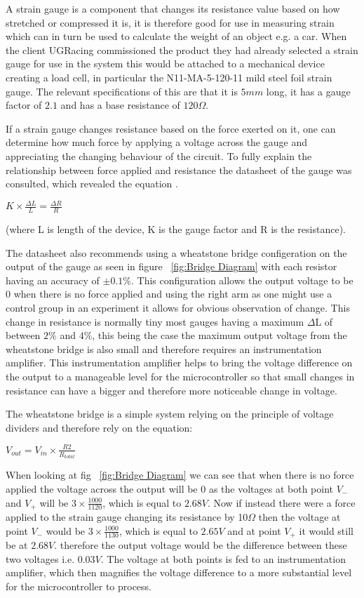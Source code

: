 A strain gauge is a component that changes its resistance value based on how stretched or compressed it is, it is therefore good for use in measuring strain which can in turn be used to calculate the weight of an object e.g. a car. When the client UGRacing commissioned the product they had already selected a strain gauge for use in the system this would be attached to a mechanical device creating a load cell, in particular the N11-MA-5-120-11 mild steel foil strain gauge. The relevant specifications of this are that it is $5mm$ long, it has a gauge factor of $2.1$ and has a base resistance of $120\Omega$.

If a strain gauge changes resistance based on the force exerted on it, one can determine how much force by applying a voltage across the gauge and appreciating the changing behaviour of the circuit. To fully explain the relationship between force applied and resistance the datasheet of the gauge was consulted, which revealed the equation \cite{strain_data_sheet}.


\centerline{$K \times \frac{\Delta L}{L} = \frac{\Delta R}{R}$}\label{eq:strain}

 (where L is length of the device, K is the gauge factor and R is the resistance).  

The datasheet also recommends using a wheatstone bridge configeration on the output of the gauge as seen in figure ~\ref{fig:Bridge Diagram} with each resistor having an accuracy of $±0.1\%$. This configuration allows the output voltage to be $0$ when there is no force applied and using the right arm as one might use a control group in an experiment it allows for obvious observation of change. This change in resistance is normally tiny most gauges having a maximum $\Delta$L of between $2\%$ and $4\%$, this being the case the maximum output voltage from the wheatstone bridge is also small and therefore requires an instrumentation amplifier. This instrumentation amplifier helps to bring the voltage difference on the output to a manageable level for the microcontroller so that small changes in resistance can have a bigger and therefore more noticeable change in voltage. 

The wheatstone bridge is a simple system relying on the principle of voltage dividers and therefore rely on the equation:

\centerline{$V_{out} = V_{in} \times \frac{R2}{R_{total}}$}\label{eq:divider}

When looking at fig ~\ref{fig:Bridge Diagram} we can see that when there is no force applied the voltage across the output will be $0$ as the voltages at both point $V_-$ and $V_+$ will be $3 \times \frac{1000}{1120}$, which is equal to $2.68V$. Now if instead there were a force applied to the strain gauge changing its resistance by 10$\Omega$ then the voltage at point $V_-$ would be $3 \times \frac{1000}{1130}$, which is equal to $2.65V$ and at point $V_+$ it would still be at $2.68V$. therefore the output voltage would be the difference between these two voltages i.e. $0.03V$. The voltage at both points is fed to an instrumentation amplifier, which then magnifies the voltage difference to a more substantial level for the microcontroller to process. 

